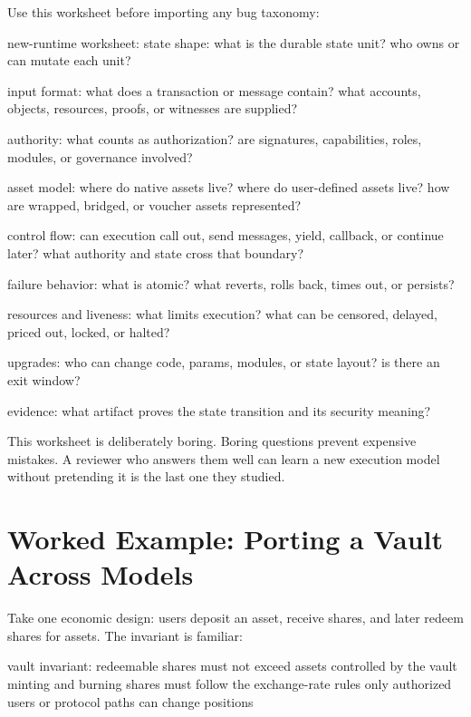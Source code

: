 Use this worksheet before importing any bug taxonomy:

\begin{codeblock}
new-runtime worksheet:
    state shape:
        what is the durable state unit?
        who owns or can mutate each unit?

    input format:
        what does a transaction or message contain?
        what accounts, objects, resources, proofs, or witnesses are supplied?

    authority:
        what counts as authorization?
        are signatures, capabilities, roles, modules, or governance involved?

    asset model:
        where do native assets live?
        where do user-defined assets live?
        how are wrapped, bridged, or voucher assets represented?

    control flow:
        can execution call out, send messages, yield, callback, or continue later?
        what authority and state cross that boundary?

    failure behavior:
        what is atomic?
        what reverts, rolls back, times out, or persists?

    resources and liveness:
        what limits execution?
        what can be censored, delayed, priced out, locked, or halted?

    upgrades:
        who can change code, params, modules, or state layout?
        is there an exit window?

    evidence:
        what artifact proves the state transition and its security meaning?
\end{codeblock}

This worksheet is deliberately boring. Boring questions prevent expensive mistakes. A reviewer who answers them well can learn a new execution model without pretending it is the last one they studied.

\section{Worked Example: Porting a Vault Across Models}

Take one economic design: users deposit an asset, receive shares, and later redeem shares for assets. The invariant is familiar:

\begin{codeblock}
vault invariant:
    redeemable shares must not exceed assets controlled by the vault
    minting and burning shares must follow the exchange-rate rules
    only authorized users or protocol paths can change positions
\end{codeblock}


